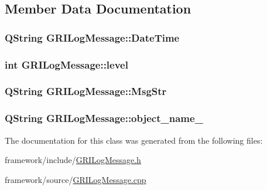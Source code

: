 \subsection{\-Member \-Data \-Documentation}
\hypertarget{classGRILogMessage_ae4cd71e75626a3674fe5aafe1e0b7259}{
\subsubsection[{\-Date\-Time}]{\setlength{\rightskip}{0pt plus 5cm}\-Q\-String {\bf \-G\-R\-I\-Log\-Message\-::\-Date\-Time}}}\label{classGRILogMessage_ae4cd71e75626a3674fe5aafe1e0b7259}
\hypertarget{classGRILogMessage_aec709c2e96c8a305ddc81d8f70b0fa28}{
\subsubsection[{level}]{\setlength{\rightskip}{0pt plus 5cm}int {\bf \-G\-R\-I\-Log\-Message\-::level}}}\label{classGRILogMessage_aec709c2e96c8a305ddc81d8f70b0fa28}
\hypertarget{classGRILogMessage_aa6d3e7887e2d5eb68e374b5a63f1557a}{
\subsubsection[{\-Msg\-Str}]{\setlength{\rightskip}{0pt plus 5cm}\-Q\-String {\bf \-G\-R\-I\-Log\-Message\-::\-Msg\-Str}}}\label{classGRILogMessage_aa6d3e7887e2d5eb68e374b5a63f1557a}
\hypertarget{classGRILogMessage_a3da4c9e80553b9dbe4539f070f4bf9df}{
\subsubsection[{object\-\_\-name\-\_\-}]{\setlength{\rightskip}{0pt plus 5cm}\-Q\-String {\bf \-G\-R\-I\-Log\-Message\-::object\-\_\-name\-\_\-}}}\label{classGRILogMessage_a3da4c9e80553b9dbe4539f070f4bf9df}


\-The documentation for this class was generated from the following files\-:\begin{DoxyCompactItemize}
\item 
framework/include/\hyperlink{GRILogMessage_8h}{\-G\-R\-I\-Log\-Message.\-h}\item 
framework/source/\hyperlink{GRILogMessage_8cpp}{\-G\-R\-I\-Log\-Message.\-cpp}\end{DoxyCompactItemize}
